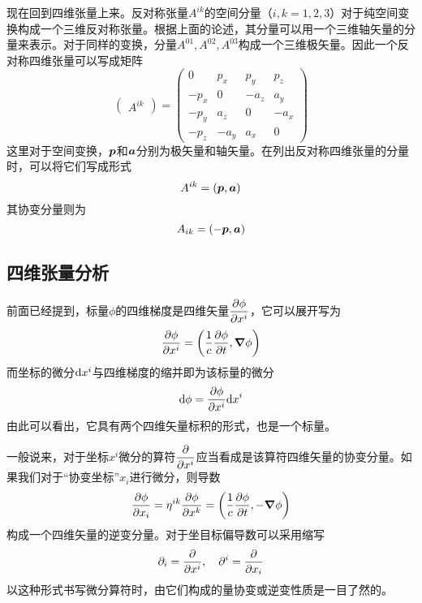 现在回到四维张量上来。反对称张量$A^{ik}$的空间分量（$i,k=1,2,3$）对于纯空间变换构成一个三维反对称张量。根据上面的论述，其分量可以用一个三维轴矢量的分量来表示。对于同样的变换，分量$A^{01},A^{02},A^{03}$构成一个三维极矢量。因此一个反对称四维张量可以写成矩阵
\begin{equation}
	\begin{pmatrix} A^{ik} \end{pmatrix} = \begin{pmatrix} 0 & p_x & p_y & p_z \\ -p_x & 0 & -a_z & a_y \\ -p_y & a_z & 0 & -a_x \\ -p_z & -a_y & a_x & 0 \end{pmatrix}
	\label{chapter1:四维反对称张量的表示}
\end{equation}
这里对于空间变换，$\boldsymbol{p}$和$\boldsymbol{a}$分别为极矢量和轴矢量。在列出反对称四维张量的分量时，可以将它们写成形式
\begin{equation}
	A^{ik} = (\boldsymbol{p},\boldsymbol{a})
	\label{chapter1:四维反对称张量的逆变分量}
\end{equation}
其协变分量则为
\begin{equation}
	A_{ik} = (-\boldsymbol{p},\boldsymbol{a})
	\label{chapter1:四维反对称张量的协变分量}
\end{equation}

\subsection{四维张量分析}

前面已经提到，标量$\phi$的四维梯度是四维矢量$\dfrac{\partial \phi}{\partial x^i}$，它可以展开写为
\begin{equation}
	\frac{\partial \phi}{\partial x^i} = \left(\frac{1}{c}\frac{\partial \phi}{\partial t},\boldsymbol{\nabla} \phi\right)
\end{equation}
而坐标的微分$\mathrm{d} x^i$与四维梯度的缩并即为该标量的微分
\begin{equation*}
	\mathrm{d}\phi = \frac{\partial \phi}{\partial x^i} \mathrm{d}x^i
\end{equation*}
由此可以看出，它具有两个四维矢量标积的形式，也是一个标量。

一般说来，对于坐标$x^i$微分的算符$\dfrac{\partial}{\partial x^i}$应当看成是该算符四维矢量的协变分量。如果我们对于“协变坐标”$x_i$进行微分，则导数
\begin{equation*}
	\frac{\partial \phi}{\partial x_i} = \eta^{ik} \frac{\partial \phi}{\partial x^k} = \left(\frac{1}{c}\frac{\partial \phi}{\partial t},-\boldsymbol{\nabla} \phi\right)
\end{equation*}
构成一个四维矢量的逆变分量。对于坐目标偏导数可以采用缩写
\begin{equation*}
	\partial_i = \frac{\partial}{\partial x^i},\quad \partial^i = \frac{\partial}{\partial x_i}
\end{equation*}
以这种形式书写微分算符时，由它们构成的量协变或逆变性质是一目了然的。

